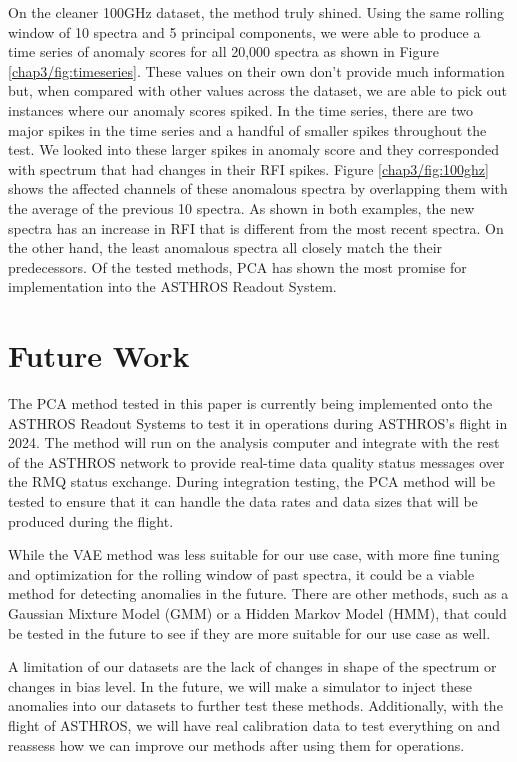 On the cleaner 100GHz dataset, the method truly shined.
Using the same rolling window of 10 spectra and 5 principal components, we were able to produce a time series of anomaly scores for all 20,000 spectra as shown in Figure \ref{chap3/fig:timeseries}.
These values on their own don't provide much information but, when compared with other values across the dataset, we are able to pick out instances where our anomaly scores spiked. 
In the time series, there are two major spikes in the time series and a handful of smaller spikes throughout the test. 
We looked into these larger spikes in anomaly score and they corresponded with spectrum that had changes in their RFI spikes.
Figure \ref{chap3/fig:100ghz} shows the affected channels of these anomalous spectra by overlapping them with the average of the previous 10 spectra. 
As shown in both examples, the new spectra has an increase in RFI that is different from the most recent spectra. 
On the other hand, the least anomalous spectra all closely match the their predecessors. 
Of the tested methods, PCA has shown the most promise for implementation into the ASTHROS Readout System. 

\section{Future Work}
\label{chap3/sec:future}
The PCA method tested in this paper is currently being implemented onto the ASTHROS Readout Systems to test it in operations during ASTHROS's flight in 2024. 
The method will run on the analysis computer and integrate with the rest of the ASTHROS network to provide real-time data quality status messages over the RMQ status exchange.
During integration testing, the PCA method will be tested to ensure that it can handle the data rates and data sizes that will be produced during the flight. 

While the VAE method was less suitable for our use case, with more fine tuning and optimization for the rolling window of past spectra, it could be a viable method for detecting anomalies in the future.
There are other methods, such as a Gaussian Mixture Model (GMM) or a Hidden Markov Model (HMM), that could be tested in the future to see if they are more suitable for our use case as well.

A limitation of our datasets are the lack of changes in shape of the spectrum or changes in bias level. 
In the future, we will make a simulator to inject these anomalies into our datasets to further test these methods. 
Additionally, with the flight of ASTHROS, we will have real calibration data to test everything on and reassess how we can improve our methods after using them for operations.